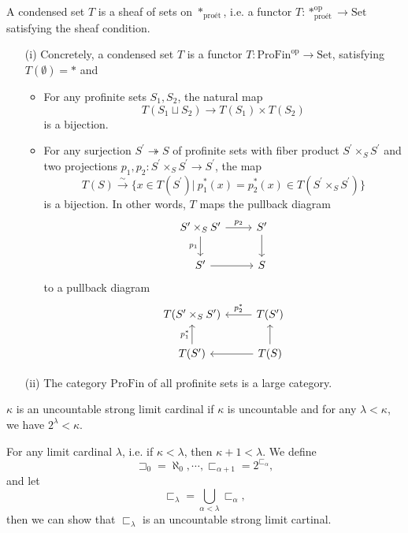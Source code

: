 \documentclass[UTF8,12,a4paper]{ctexart}
\theoremstyle{definition}
\begin{document}
\dfn 
A condensed set $T$ is a sheaf of sets on $*_{\text{pro\'et}}$, i.e. a functor $T:*_{\text{pro\'et}}^{\text{op}}\to \text{Set}$ satisfying the sheaf condition.
\rem 
\begin{itemize}
	\item [(i)] Concretely, a condensed set $T$ is a functor $T:\text{ProFin}^\text{op}\rightarrow \text{Set}$, satisfying $T(\emptyset)=*$ and
	\begin{itemize}
		\item For any profinite sets $S_1, S_2$, the natural map
		$$
		T(S_1\sqcup S_2)\longrightarrow T(S_1)\times T(S_2)
		$$
		is a bijection.
		\item For any surjection $S^\prime\twoheadrightarrow S$ of profinite sets with fiber product $S^\prime\times_{S} S^\prime$ and two projections $p_1,p_2:S^\prime\times_{S} S^\prime\rightarrow S^\prime$, the map
		$$
		T(S)\stackrel{\sim}{\longrightarrow}\{x\in T(S^\prime)|\  p_1^*(x)=p_2^*(x)\in T(S^\prime\times_{S} S^\prime)\}
		$$
		is a bijection. In other words, $T$ maps the pullback diagram
		\begin{equation*}		
		\begin{tikzcd}
		S^\prime\times_{S} S^\prime \arrow[d, "p_1"'] \arrow[r, "p_2"] & S^\prime \arrow[d] \\
		S^\prime \arrow[r]                                             & S                 
		\end{tikzcd}
		\end{equation*}
		to a pullback diagram
		\begin{equation*}	
		\begin{tikzcd}
		T(S^\prime\times_{S} S^\prime) & T(S^\prime) \arrow[l, "p_2^*"'] \\
		T(S^\prime) \arrow[u, "p_1^*"] & T(S) \arrow[l] \arrow[u]       
		\end{tikzcd}
		\end{equation*}
	\end{itemize}
	\item [(ii)] The category $\text{ProFin}$ of all profinite sets is a large category.
\end{itemize}

\dfn 
$\kappa$ is an uncountable strong limit cardinal if $\kappa$ is uncountable and for any $\lambda<\kappa$, we have $2^\lambda<\kappa$.

\exm 
For any limit cardinal $\lambda$, i.e. if $\kappa<\lambda$, then $\kappa+1<\lambda.$ We define
$$\sqsupset_0=\aleph_0,\cdots, \sqsubset_{\alpha+1}=2^{\sqsubset_{\alpha}},$$
and let 
$$\sqsubset_{\lambda}=\bigcup_{\alpha<\lambda}\sqsubset_{\alpha},$$
then we can show that $\sqsubset_{\lambda}$ is an uncountable strong limit cartinal.
\end{document}
